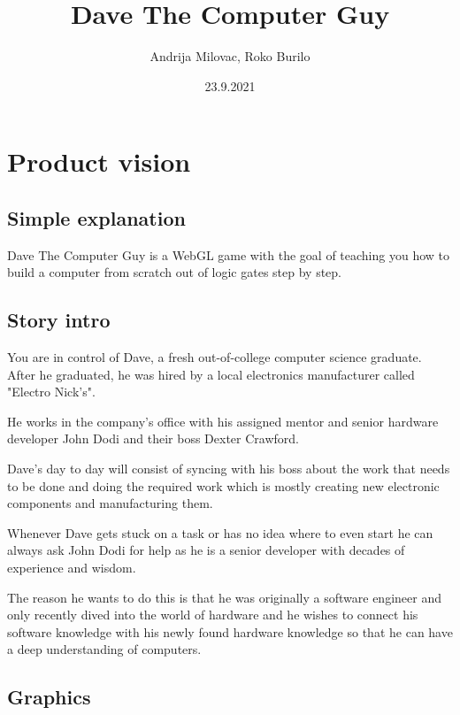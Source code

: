 \documentclass[12pt]{article}
\author{Andrija Milovac, Roko Burilo}
\title{Dave The Computer Guy}
\date{23.9.2021}
\begin{document}
\maketitle
\tableofcontents
\section{Product vision}
\subsection{Simple explanation}
Dave The Computer Guy is a WebGL game with the goal of teaching you how to build a computer from scratch out of logic gates step by step.
\subsection{Story intro}
You are in control of Dave, a fresh out-of-college computer science graduate.
After he graduated, he was hired by a local electronics manufacturer called "Electro Nick's".

He works in the company's office with his assigned mentor and senior hardware developer John Dodi and their boss Dexter Crawford.

Dave's day to day will consist of syncing with his boss about the work that needs to be done and doing the required work which is mostly
creating new electronic components and manufacturing them.

Whenever Dave gets stuck on a task or has no idea where to even start he can always ask John Dodi for help as he is a senior developer with
decades of experience and wisdom.

The reason he wants to do this is that he was originally a software engineer and only recently dived into the world of hardware and he
wishes to connect his software knowledge with his newly found hardware knowledge so that he can have a deep understanding of computers.

\subsection{Graphics}
\end{document}
